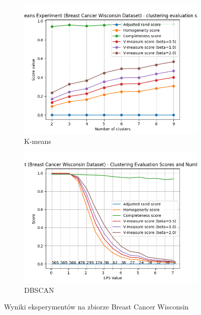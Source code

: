 \documentclass[12pt]{article}
\begin{document}
\begin{figure}[H]
    \centering
    \begin{subfigure}[t]{0.3\textwidth}
        \includegraphics[width=\linewidth]{img/other_datasets/cancer_kmeans_best.png}
        \caption{K-means}
    \end{subfigure}
    \hspace{3em}
    \begin{subfigure}[t]{0.3\textwidth}
        \includegraphics[width=\linewidth]{img/other_datasets/cancer_dbscan_scores.png}
        \caption{DBSCAN}
    \end{subfigure}
    \caption{Wyniki eksperymentów na zbiorze Breast Cancer Wisconsin}
\end{figure}
\end{document}
